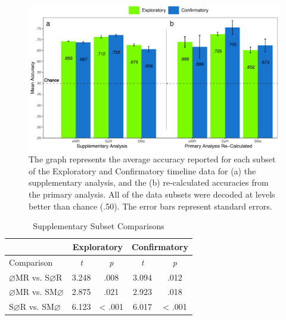 \documentclass[
  english,
  man, donotrepeattitle,floatsintext]{apa6}
\begin{document}
\begin{figure}
\centering
\includegraphics{figures/supp_analysis/supp_subset_chance.pdf}
\caption{\label{fig:supp-chance}The graph represents the average accuracy reported for each subset of the Exploratory and Confirmatory timeline data for (a) the supplementary analysis, and the (b) re-calculated accuracies from the primary analysis. All of the data subsets were decoded at levels better than chance (.50). The error bars represent standard errors.}
\end{figure}

\begin{table}[!h]
    \centering
    \caption{Supplementary Subset Comparisons}
    \label{tab:supp-comparisons}
    \begin{tabular}{l c c c c}
         & \multicolumn{2}{c}{Exploratory} & \multicolumn{2}{c}{Confirmatory} \\
        \hline
        Comparison & \textit{t} & \multicolumn{1}{c|}{\textit{p}} & \textit{t} & \textit{p} \\
        \hline
        $\varnothing$MR vs. S$\varnothing$R & 3.248 & \multicolumn{1}{c|}{.008} & 3.094 & .012 \\
        $\varnothing$MR vs. SM$\varnothing$ & 2.875 & \multicolumn{1}{c|}{.021} & 2.923 & .018 \\
        S$\varnothing$R vs. SM$\varnothing$ & 6.123 & \multicolumn{1}{c|}{< .001} & 6.017 & < .001 \\
        \hline
    \end{tabular}
\end{table}
\end{document}
